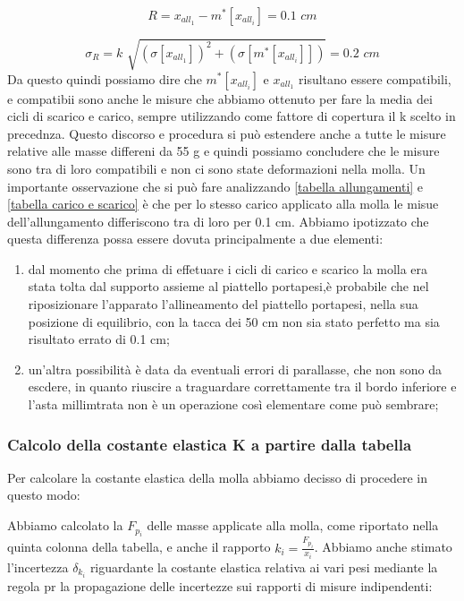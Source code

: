 \begin{equation*}
	R = x_{all_1} - m^*[x_{all_i}] = 0.1 \,\,cm
\end{equation*}

\begin{equation*}
	\sigma_{R} = k\,\, \sqrt{(\sigma[x_{all_1}])^2 + (\sigma[m^*[x_{all_i}]])} = 0.2 \,\,cm
\end{equation*}
%
Da questo quindi possiamo dire che $m^*[x_{all_i}]$ e $x_{all_1}$ risultano essere compatibili, e compatibii sono anche le misure che abbiamo ottenuto per fare la media dei cicli di scarico e carico, sempre utilizzando come fattore di copertura il k scelto in precednza.
Questo discorso e procedura si può estendere anche a tutte le misure relative alle masse differeni da 55 g e quindi possiamo concludere che le misure sono tra di loro compatibili e non ci sono state deformazioni nella molla.
Un importante osservazione che si può fare analizzando \ref{tabella allungamenti} e \ref{tabella carico e scarico} è che per lo stesso carico applicato alla molla le misue dell'allungamento differiscono tra di loro per 0.1 cm. Abbiamo ipotizzato che questa differenza possa essere dovuta principalmente a due elementi:

\begin{enumerate}
	\item{dal momento che prima di effetuare i cicli di carico e scarico la molla era stata tolta dal supporto assieme al piattello portapesi,è probabile che nel riposizionare l'apparato l'allineamento del piattello portapesi, nella sua posizione di equilibrio, con la tacca dei 50 cm non sia stato perfetto ma sia risultato errato di 0.1 cm;}
	\item{un'altra possibilità è data da eventuali errori di parallasse, che non sono da escdere, in quanto riuscire a traguardare correttamente tra il bordo inferiore e l'asta millimtrata non è un operazione così elementare come può sembrare;}
\end{enumerate}

\subsubsection{Calcolo della costante elastica K a partire dalla tabella}
Per calcolare la costante elastica della molla abbiamo decisso di procedere in questo modo:

Abbiamo calcolato la $F_{p_{i}}$ delle masse applicate alla molla, come riportato nella quinta colonna della tabella, e anche il rapporto $k_{i} = \frac{F_{p_{i}}}{x_{i}}$. Abbiamo anche stimato l'incertezza $\delta_{k_{i}}$ riguardante la costante elastica relativa ai vari pesi mediante la regola pr la propagazione delle incertezze sui rapporti di misure indipendenti:

